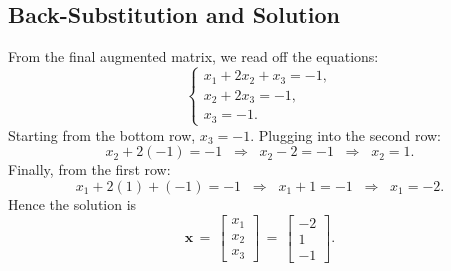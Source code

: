 \documentclass{article}
\begin{document}
\subsection*{Back-Substitution and Solution}
From the final augmented matrix, we read off the equations:
\[
\begin{cases}
x_1 + 2x_2 + x_3 = -1,\\
x_2 + 2x_3 = -1,\\
x_3 = -1.
\end{cases}
\]
Starting from the bottom row, \(x_3 = -1\). Plugging into the second row:
\[
x_2 + 2(-1) = -1 \;\;\Longrightarrow\;\; x_2 - 2 = -1 \;\;\Longrightarrow\;\; x_2 = 1.
\]
Finally, from the first row:
\[
x_1 + 2(1) + (-1) = -1 
\;\;\Longrightarrow\;\;
x_1 + 1 = -1
\;\;\Longrightarrow\;\;
x_1 = -2.
\]
Hence the solution is
\[
\mathbf{x} 
\,=\, 
\begin{bmatrix}
x_1\\
x_2\\
x_3
\end{bmatrix}
\,=\, 
\begin{bmatrix}
-2\\
1\\
-1
\end{bmatrix}.
\]
\end{document}
